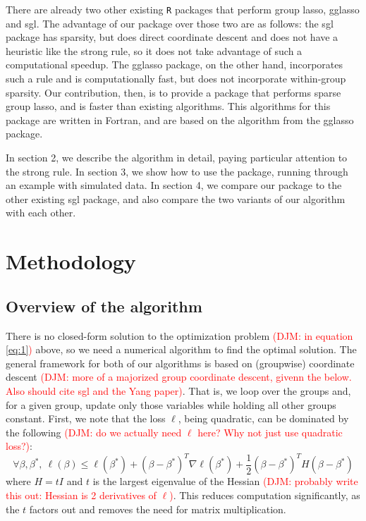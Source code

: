 \documentclass[titlepage]{article}
\newcommand{\djm}[1]{\textcolor{red}{(DJM: #1)}}
\begin{document}
There are already two other existing \texttt{R} packages that perform group lasso, gglasso and sgl. The advantage of our package over those two are as follows: the sgl package has sparsity, but does direct coordinate descent and does not have a heuristic like the strong rule, so it does not take advantage of such a computational speedup. The gglasso package, on the other hand, incorporates such a rule and is computationally fast, but does not incorporate within-group sparsity. Our contribution, then, is to provide a package that performs sparse group lasso, and is faster than existing algorithms. This algorithms for this package are written in Fortran, and are based on the algorithm from the gglasso package.

In section 2, we describe the algorithm in detail, paying particular attention to the strong rule. In section 3, we show how to use the package, running through an example with simulated data. In section 4, we compare our package to the other existing sgl package, and also compare the two variants of our algorithm with each other.

\section{Methodology}

\subsection{Overview of the algorithm}

There is no closed-form solution to the optimization problem \djm{in equation \eqref{eq:1}} above, so we need a numerical algorithm to find the optimal solution. The general framework for both of our algorithms is based on (groupwise) coordinate descent \djm{more of a majorized group coordinate descent, givenn the below. Also should cite sgl and the Yang paper}. That is, we loop over the groups and, for a given group, update only those variables while holding all other groups constant. First, we note that the loss $\ell$, being quadratic, can be dominated by the following \djm{do we actually need $\ell$ here? Why not just use quadratic loss?}:
\[
\forall \beta,\beta^*,\ \ell(\beta) \leq \ell(\beta^*)+(\beta - \beta^*)^T\nabla \ell(\beta^*)+\frac{1}{2}(\beta - \beta^*)^T H (\beta - \beta^*)
\]
where $H = tI$ and $t$ is the largest eigenvalue of the Hessian \djm{probably write this out: Hessian is 2 derivatives of $\ell$}. This reduces computation significantly, as the $t$ factors out and removes the need for matrix multiplication.
\end{document}
